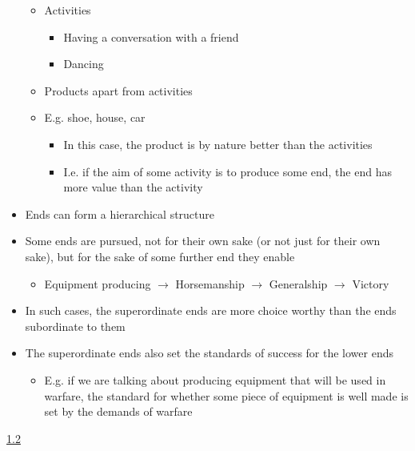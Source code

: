 \documentclass[11pt]{article}
\begin{document}
\begin{itemize}
\begin{itemize}\item{Activities}\begin{itemize}\item{Having a conversation with a friend}\item{Dancing}\end{itemize}\item{Products apart from activities}\item{E.g. shoe, house, car}\begin{itemize}\item{In this case, the product is by nature better than the activities}\item{I.e. if the aim of some activity is to produce some end, the end has more value than the activity}\end{itemize}\end{itemize}

\item{Ends can form a hierarchical structure}\item{Some ends are pursued, not for their own sake (or not just for their own sake), but for the sake of some further end they enable}\begin{itemize}\item{Equipment producing $\rightarrow$ Horsemanship $\rightarrow$ Generalship $\rightarrow$ Victory}\end{itemize}

\item{In such cases, the superordinate ends are more choice worthy than the ends subordinate to them}\item{The superordinate ends also set the standards of success for the lower ends}\begin{itemize}\item{E.g. if we are talking about producing equipment that will be used in warfare, the standard for whether some piece of equipment is well made is set by the demands of warfare}\end{itemize}

\end{itemize}

\noindent\underline{1.2}
\end{document}
